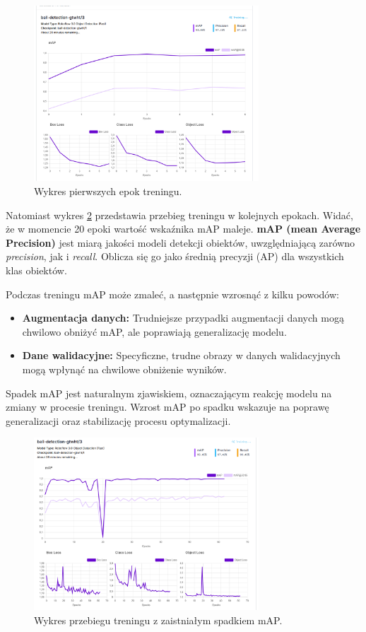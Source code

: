 \documentclass[a4paper,twoside,12pt]{book}
\begin{document}
\begin{figure}[h]
    \centering
    \includegraphics[width=0.75\textwidth]{Images/Roboflow/poczatek uczenia.png}
    \caption{Wykres pierwszych epok treningu.}
    \label{fig:Wykrespoczatek}
\end{figure}

\newpage
Natomiast wykres \ref{fig:Wykres2} przedstawia przebieg treningu w kolejnych epokach. Widać, że w momencie 20 epoki wartość wskaźnika mAP maleje. 
\textbf{mAP (mean Average Precision)} jest miarą jakości modeli detekcji obiektów, uwzględniającą zarówno \textit{precision}, jak i \textit{recall}. Oblicza się go jako średnią precyzji (AP) dla wszystkich klas obiektów.

Podczas treningu mAP może zmaleć, a następnie wzrosnąć z kilku powodów:
\begin{itemize}
    \item \textbf{Augmentacja danych:} Trudniejsze przypadki augmentacji danych mogą chwilowo obniżyć mAP, ale poprawiają generalizację modelu.
    \item \textbf{Dane walidacyjne:} Specyficzne, trudne obrazy w danych walidacyjnych mogą wpłynąć na chwilowe obniżenie wyników.
\end{itemize}

Spadek mAP jest naturalnym zjawiskiem, oznaczającym reakcję modelu na zmiany w procesie treningu. Wzrost mAP po spadku wskazuje na poprawę generalizacji oraz stabilizację procesu optymalizacji.

\begin{figure}[h]
    \centering
    \includegraphics[width=0.75\textwidth]{Images/Roboflow/wykres2.png}
    \caption{Wykres przebiegu treningu z zaistniałym spadkiem mAP.}
    \label{fig:Wykres2}
\end{figure}
\end{document}
